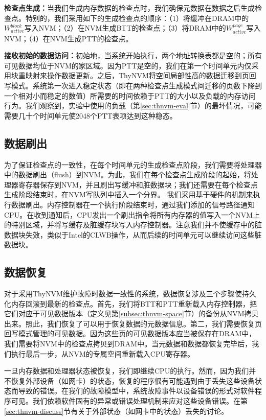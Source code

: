 \textbf{检查点生成：}当我们生成内存数据的检查点时，我们确保元数据在数据之后生成检查点。特别的，我们采用如下的生成检查点的顺序：（1）将缓冲在DRAM中的$W^{block}_{active}$写入NVM；（2）在NVM生成BTT的检查点；（3）将DRAM中的$W^{page}_{active}$写入NVM；（4）在NVM生成PTT的检查点。

\textbf{接收初始的数据访问：}初始地，当系统开始执行，两个地址转换表都是空的；所有可见数据均位于NVM的家区域。因为PTT是空的，我们在第一个时间单元内仅采用块重映射来操作数据更新。之后，ThyNVM将空间局部性高的数据迁移到页回写模式。系统第一次进入稳定状态（即在两种检查点生成模式间迁移的页数下降到一个相对小而稳定的数值）所需要的时间依赖于PTT的大小以及负载的内存访问行为。我们观察到，实验中使用的负载（第\ref{sec:thnvm-eval}节）的最坏情况，可能需要几十个时间单元使2048个PTT表项达到这种稳态。

\subsection{数据刷出}

为了保证检查点的一致性，在每个时间单元的生成检查点阶段，我们需要将处理器中的数据刷出（flush）到NVM。为此，我们在每个检查点生成阶段的起始，将处理器寄存器保存到NVM，并且刷出写缓冲和脏数据块；我们还需要在每个检查点生成阶段结束时，在NVM写队列中插入一个分界。 
我们采用基于硬件的机制来执行数据刷出。内存控制器在一个执行阶段结束时，通过我们添加的信号路径通知CPU。在收到通知后，CPU发出一个刷出指令将所有内存器的值写入一个NVM上的特别区域，并将写缓存及脏缓存块写入内存控制器。注意我们并不使缓存中的脏数据块失效，类似于Intel的CLWB操作，从而后续的时间单元可以继续访问这些脏数据块。

\subsection{数据恢复} 
对于采用ThyNVM维护故障时数据一致性的系统，数据恢复涉及三个步骤使持久化内存回滚到最新的检查点。首先，我们将BTT和PTT重新载入内存控制器，把它们对应于可见数据版本（定义见第\ref{subsec:thnvm-space}节）的备份从NVM拷贝出来。照此，我们恢复了可以用于恢复数据的元数据信息。第二，我们需要恢复页回写模式管理的可见数据。因为这些页的可见数据版本应当被保存在DRAM中，我们需要将NVM中的检查点拷贝到DRAM中。当元数据和数据都恢复完毕后，我们执行最后一步，从NVM的专属空间重新载入CPU寄存器。 

一旦内存数据和处理器状态被恢复，我们即继续CPU的执行。然而，因为我们并不恢复外部设备（如网卡）的状态，恢复的程序很有可能遇到由于丢失这些设备状态而导致的错误。在我们的故障模型中，系统故障事件以设备错误的形式对软件程序可见。我们依赖软件固有的异常或错误处理机制来应对这些设备错误。在第\ref{sec:thnvm-discuss}节有关于外部状态（如网卡中的状态）丢失的讨论。 

